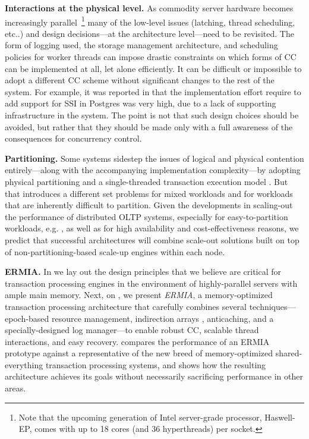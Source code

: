 \vspace{2mm}
{\bf Interactions at the physical level.} 
As commodity server hardware becomes increasingly parallel~\footnote{Note that the upcoming generation of Intel server-grade processor, Haswell-EP, comes with up to 18 cores (and 36 hyperthreads) per socket.} many of the low-level issues (latching, thread scheduling, etc..) and design decisions---at the architecture level---need to be revisited. The form of logging used, the storage management architecture, and scheduling policies for worker threads can impose drastic constraints on which forms of CC can be implemented at all, let alone efficiently. 
It can be difficult or impossible to adopt a different CC scheme without significant changes to the rest of the system. 
For example, it was reported in \cite{PortsG12} that the implementation effort require to add support for SSI in Postgres was very high, due to a lack of supporting infrastructure in the system. 
The point is not that such design choices should be avoided, but rather that they should be made only with a full awareness of the consequences for concurrency control. 

\vspace{2mm}
{\bf Partitioning.} Some systems sidestep the issues of logical and physical contention entirely---along with the accompanying implementation complexity---by adopting physical partitioning and a single-threaded transaction execution model \cite{Kallman+08,KemperN11}. But that introduces a different set problems for mixed workloads and for workloads that are inherently difficult to partition.  Given the developments in scaling-out the performance of distributed OLTP systems, especially for easy-to-partition workloads, e.g. \cite{Corbett+12,BailisFHGS14,ThomsonA10}, as well as for high availability and cost-effectiveness reasons, we predict that successful architectures will combine scale-out solutions built on top of non-partitioning-based scale-up engines within each node.

\vspace{2mm}
{\bf ERMIA.} 
In  we lay out the design principles that we believe are critical for transaction processing engines in the environment of highly-parallel servers with ample main memory. Next, on , we present {\em ERMIA}, a memory-optimized transaction processing architecture that carefully combines several techniques---epoch-based resource management, indirection arrays  \cite{SadoghiRCB13}, anticaching\cite{who?}, and a specially-designed log manager---to enable robust CC, scalable thread interactions, and easy recovery.  
 compares the performance of an ERMIA prototype against a representative of the new breed of memory-optimized shared-everything transaction processing systems, and shows how the resulting architecture achieves its goals without necessarily sacrificing performance in other areas.


